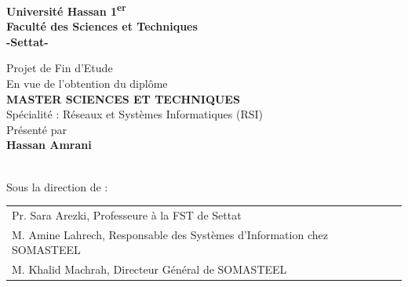 \begin{titlepage}
  \thispagestyle{empty}
  \singlespacing
  \centering
  \vspace*{-0.2cm}

  \noindent
  \begin{minipage}[t]{0.22\textwidth}
    \raggedright
  \end{minipage}%
  \begin{minipage}[t]{0.56\textwidth}
    \centering
    {\large\bfseries Université Hassan 1\textsuperscript{er}}\\[2pt]
    {\large\bfseries Faculté des Sciences et Techniques}\\[2pt]
    {\large\bfseries -Settat-}
  \end{minipage}%
  \begin{minipage}[t]{0.22\textwidth}
    \raggedleft
  \end{minipage}

  \vspace{1.15cm}

  {\LARGE Projet de Fin d'Etude}\\[6pt]
  {\large En vue de l'obtention du diplôme}\\[18pt]

  {\LARGE\bfseries MASTER SCIENCES ET TECHNIQUES}\\[6pt]
  {\large Spécialité : Réseaux et Systèmes Informatiques (RSI)}\\[20pt]

  {\large Présenté par}\\[8pt]
  {\large\bfseries Hassan Amrani}\\[18pt]

  \titreprojet

  \vspace{10pt}
  \\[16pt]

  {\large Sous la direction de :}\\[8pt]
  {%
    \setlength{\tabcolsep}{0pt}%
    \begin{tabular}{@{}l@{}}
      Pr. Sara Arezki, Professeure à la FST de Settat\\[3pt]
      M. Amine Lahrech, Responsable des Systèmes d'Information chez SOMASTEEL\\[3pt]
      M. Khalid Machrah, Directeur Général de SOMASTEEL\\[3pt]
    \end{tabular}%
  }\\[16pt]


\end{titlepage}
